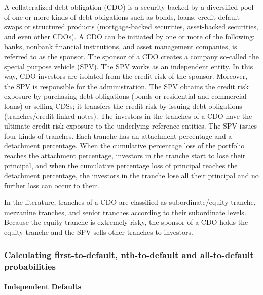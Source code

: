 \documentclass[11pt]{article}
\begin{document}
A collateralized debt obligation (CDO) is a security backed by a
diversified pool of one or more kinds of debt obligations such as bonds,
loans, credit default swaps or structured products (mortgage-backed
securities, asset-backed securities, and even other CDOs). A CDO can be
initiated by one or more of the following: banks, nonbank financial
institutions, and asset management companies, is referred to as the
sponsor. The sponsor of a CDO creates a company so-called the special
purpose vehicle (SPV). The SPV works as an independent entity. In this
way, CDO investors are isolated from the credit risk of the sponsor.
Moreover, the SPV is responsible for the administration. The SPV obtains
the credit risk exposure by purchasing debt obligations (bonds or
residential and commercial loans) or selling CDSs; it transfers the
credit risk by issuing debt obligations (tranches/credit-linked notes).
The investors in the tranches of a CDO have the ultimate credit risk
exposure to the underlying reference entities. The SPV issues four kinds
of tranches. Each tranche has an attachment percentage and a detachment
percentage. When the cumulative percentage loss of the portfolio reaches
the attachment percentage, investors in the tranche start to lose their
principal, and when the cumulative percentage loss of principal reaches
the detachment percentage, the investors in the tranche lose all their
principal and no further loss can occur to them.

In the literature, tranches of a CDO are classified as
subordinate/equity tranche, mezzanine tranches, and senior tranches
according to their subordinate levels. Because the equity tranche is
extremely risky, the sponsor of a CDO holds the equity tranche and the
SPV sells other tranches to investors.

\hypertarget{calculating-first-to-default-nth-to-default-and-all-to-default-probabilities}{%
\subsubsection{Calculating first-to-default, nth-to-default and
all-to-default
probabilities}\label{calculating-first-to-default-nth-to-default-and-all-to-default-probabilities}}

\hypertarget{independent-defaults}{%
\paragraph{Independent Defaults}\label{independent-defaults}}
\end{document}
